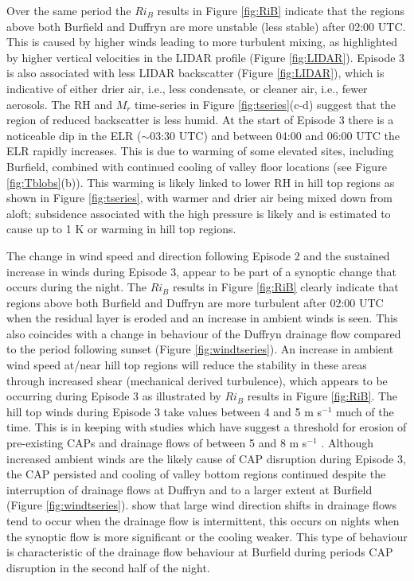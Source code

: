 \documentclass[times]{qjrms4}
\begin{document}
Over the same period the $Ri_B$ results in Figure \ref{fig:RiB} indicate that the regions above both Burfield and Duffryn are more unstable (less stable) after 02:00 UTC. This is caused by higher winds leading to more turbulent mixing, as highlighted by higher vertical velocities in the LIDAR profile (Figure \ref{fig:LIDAR}). Episode 3 is also associated with less LIDAR backscatter (Figure \ref{fig:LIDAR}), which is indicative of either drier air, i.e., less condensate, or cleaner air, i.e., fewer aerosols. The RH and $M_r$ time-series in Figure \ref{fig:tseries}(c-d) suggest that the region of reduced backscatter is less humid. At the start of Episode 3 there is a noticeable dip in the ELR ($\sim$03:30 UTC) and between 04:00 and 06:00 UTC the ELR rapidly increases. This is due to warming of some elevated sites, including Burfield, combined with continued cooling of valley floor locations (see Figure \ref{fig:Tblobs}(b)). This warming is likely linked to lower RH in hill top regions as shown in Figure \ref{fig:tseries}, with warmer and drier air being mixed down from aloft; subsidence associated with the high pressure is likely and is estimated to cause up to 1 K or warming in hill top regions.

The change in wind speed and direction following Episode 2 and the sustained increase in winds during Episode 3, appear to be part of a synoptic change that occurs during the night. The $Ri_B$ results in Figure \ref{fig:RiB} clearly indicate that regions above both Burfield and Duffryn are more turbulent after 02:00 UTC when the residual layer is eroded and an increase in ambient winds is seen. This also coincides with a change in behaviour of the Duffryn drainage flow compared to the period following sunset (Figure \ref{fig:windtseries}). An increase in ambient wind speed at/near hill top regions will reduce the stability in these areas through increased shear (mechanical derived turbulence), which appears to be occurring during Episode 3 as illustrated by $Ri_B$ results in Figure \ref{fig:RiB}. The hill top winds during Episode 3 take values between 4 and 5 m s$^{-1}$ much of the time. This is in keeping with studies which have suggest a threshold for erosion of pre-existing CAPs and drainage flows of between 5 and 8 m s$^{-1}$ \citep{barr1989influence,orgill1992mesoscale,bogren2000local,iijima2000seasonal,whiteman2001cold,vosper2008numerical}. Although increased ambient winds are the likely cause of CAP disruption during Episode 3, the CAP persisted and cooling of valley bottom regions continued despite the interruption of drainage flows at Duffryn and to a larger extent at Burfield (Figure \ref{fig:windtseries}). \citet{mahrt2010non} show that large wind direction shifts in drainage flows tend to occur when the drainage flow is intermittent, this occurs on nights when the synoptic flow is more significant or the cooling weaker. This type of behaviour is characteristic of the drainage flow behaviour at Burfield during periods CAP disruption in the second half of the night.
\end{document}
